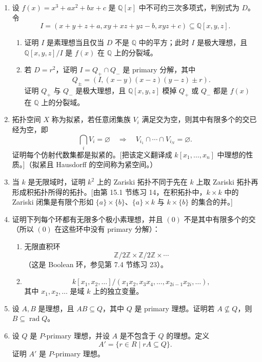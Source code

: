 \begin{enumerate}[label=\arabic*.]
	\item 设 $f(x)=x^3+ax^2+bx+c$ 是 $\mathbb Q[x]$ 中不可约三次多项式，判别式为 $D$。令
	\[
	I=(x+y+z+a,
	xy+xz+yz-b,
	xyz+c)\subseteq\mathbb Q[x,y,z].
	\]
	\begin{enumerate}[label=(\alph*)]
		\item 证明 $I$ 是素理想当且仅当 $D$ 不是 $\mathbb Q$ 中的平方；此时 $I$ 是极大理想，且 $\mathbb Q[x,y,z]/I$ 是 $f(x)$ 在 $\mathbb Q$ 上的分裂域。
		\item 若 $D=r^2$，证明 $I=Q_+\cap Q_-$ 是 primary 分解，其中
		\[
		Q_\pm=(I,
		(x-y)(x-z)(y-z)\pm r).
		\]
		证明 $Q_+$ 与 $Q_-$ 是极大理想，且 $\mathbb Q[x,y,z]$ 模掉 $Q_+$ 或 $Q_-$ 都是 $f(x)$ 在 $\mathbb Q$ 上的分裂域。
	\end{enumerate}
	
	\item 拓扑空间 $X$ 称为拟紧，若任意闭集族 $V_i$ 满足交为空，则其中有限多个的交已经为空，即
	\[
	\bigcap_i V_i=\varnothing
	\quad\Rightarrow\quad
	V_{i_1}\cap\cdots\cap V_{i_N}=\varnothing.
	\]
	证明每个仿射代数集都是拟紧的。[把该定义翻译成 $k[x_1,
	\ldots,x_n]$ 中理想的性质。]（拟紧且 Hausdorff 的空间称为紧空间。）
	
	\item 当 $k$ 是无限域时，证明 $k^2$ 上的 Zariski 拓扑不同于先在 $k$ 上取 Zariski 拓扑再形成积拓扑所得的拓扑。[由第 15.1 节练习 14，在积拓扑中，$k\times k$ 中的 Zariski 闭集是有限个形如 $\{a\}\times\{b\}$、$\{a\}\times k$ 与 $k\times\{b\}$ 的集合的并。]
	
	\item 证明下列每个环都有无限多个极小素理想，并且 $(0)$ 不是其中有限多个的交（所以 $(0)$ 在这些环中没有 primary 分解）：
	\begin{enumerate}[label=(\alph*)]
		\item 无限直积环
		\[
		\mathbb Z/2\mathbb Z\times\mathbb Z/2\mathbb Z\times\cdots
		\]
		（这是 Boolean 环，参见第 7.4 节练习 23）。
		\item
		\[
		k[x_1,x_2,
		\ldots]/(x_1x_2,x_3x_4,
		\ldots,x_{2i-1}x_{2i},
		\ldots),
		\]
		其中 $x_1,x_2,
		\ldots$ 是域 $k$ 上的独立变量。
	\end{enumerate}
	
	\item 设 $A,B$ 是理想，且 $AB\subseteq Q$，其中 $Q$ 是 primary 理想。证明若 $A\not\subseteq Q$，则 $B\subseteq\operatorname{rad}Q$。
	
	\item 设 $Q$ 是 $P$-primary 理想，并设 $A$ 是不包含于 $Q$ 的理想。定义
	\[
	A'=\{r\in R\mid rA\subseteq Q\}.
	\]
	证明 $A'$ 是 $P$-primary 理想。
	

\end{enumerate}
